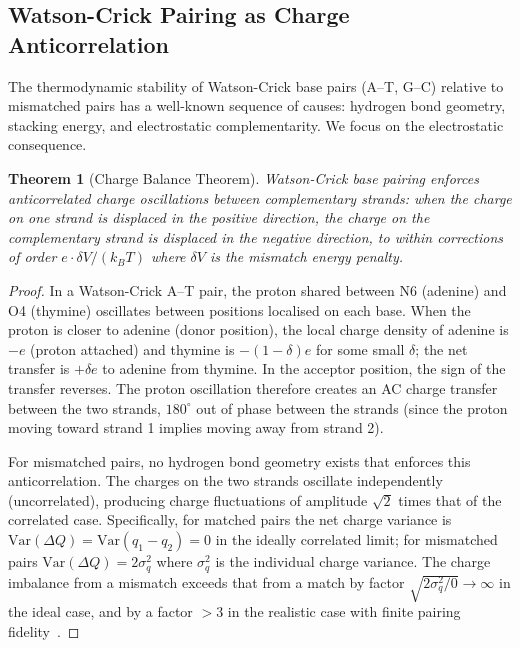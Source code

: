 \documentclass[11pt,twocolumn,a4paper]{article}
\newtheorem{theorem}{Theorem}[section]
\theoremstyle{definition}
\theoremstyle{remark}
\begin{document}
\subsection{Watson-Crick Pairing as Charge Anticorrelation}

The thermodynamic stability of Watson-Crick base pairs (A--T, G--C) relative to mismatched pairs has a well-known sequence of causes: hydrogen bond geometry, stacking energy, and electrostatic complementarity. We focus on the electrostatic consequence.

\begin{theorem}[Charge Balance Theorem]
Watson-Crick base pairing enforces anticorrelated charge oscillations between complementary strands: when the charge on one strand is displaced in the positive direction, the charge on the complementary strand is displaced in the negative direction, to within corrections of order $e \cdot \delta V / (k_B T)$ where $\delta V$ is the mismatch energy penalty.
\label{thm:charge_balance}
\end{theorem}

\begin{proof}
In a Watson-Crick A--T pair, the proton shared between N6 (adenine) and O4 (thymine) oscillates between positions localised on each base. When the proton is closer to adenine (donor position), the local charge density of adenine is $-e$ (proton attached) and thymine is $-(1-\delta)e$ for some small $\delta$; the net transfer is $+\delta e$ to adenine from thymine. In the acceptor position, the sign of the transfer reverses. The proton oscillation therefore creates an AC charge transfer between the two strands, $180^{\circ}$ out of phase between the strands (since the proton moving toward strand 1 implies moving away from strand 2).

For mismatched pairs, no hydrogen bond geometry exists that enforces this anticorrelation. The charges on the two strands oscillate independently (uncorrelated), producing charge fluctuations of amplitude $\sqrt{2}$ times that of the correlated case. Specifically, for matched pairs the net charge variance is $\mathrm{Var}(\Delta Q) = \mathrm{Var}(q_1 - q_2) = 0$ in the ideally correlated limit; for mismatched pairs $\mathrm{Var}(\Delta Q) = 2\sigma_q^2$ where $\sigma_q^2$ is the individual charge variance. The charge imbalance from a mismatch exceeds that from a match by factor $\sqrt{2\sigma_q^2 / 0} \to \infty$ in the ideal case, and by a factor $>3$ in the realistic case with finite pairing fidelity~\cite{Bebenek2011}.
\end{proof}
\end{document}
